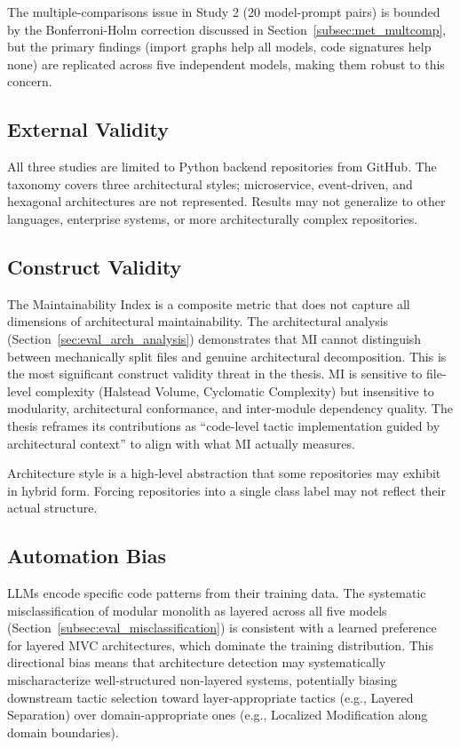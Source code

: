 The multiple-comparisons issue in Study 2 (20 model-prompt pairs) is bounded by the Bonferroni-Holm correction discussed in Section~\ref{subsec:met_multcomp}, but the primary findings (import graphs help all models, code signatures help none) are replicated across five independent models, making them robust to this concern.

\subsection{External Validity}

All three studies are limited to Python backend repositories from GitHub. The taxonomy covers three architectural styles; microservice, event-driven, and hexagonal architectures are not represented. Results may not generalize to other languages, enterprise systems, or more architecturally complex repositories.

\subsection{Construct Validity}

The Maintainability Index is a composite metric that does not capture all dimensions of architectural maintainability. The architectural analysis (Section~\ref{sec:eval_arch_analysis}) demonstrates that MI cannot distinguish between mechanically split files and genuine architectural decomposition. This is the most significant construct validity threat in the thesis. MI is sensitive to file-level complexity (Halstead Volume, Cyclomatic Complexity) but insensitive to modularity, architectural conformance, and inter-module dependency quality. The thesis reframes its contributions as ``code-level tactic implementation guided by architectural context'' to align with what MI actually measures.

Architecture style is a high-level abstraction that some repositories may exhibit in hybrid form. Forcing repositories into a single class label may not reflect their actual structure.

\subsection{Automation Bias}

LLMs encode specific code patterns from their training data. The systematic misclassification of modular monolith as layered across all five models (Section~\ref{subsec:eval_misclassification}) is consistent with a learned preference for layered MVC architectures, which dominate the training distribution. This directional bias means that architecture detection may systematically mischaracterize well-structured non-layered systems, potentially biasing downstream tactic selection toward layer-appropriate tactics (e.g., Layered Separation) over domain-appropriate ones (e.g., Localized Modification along domain boundaries).

